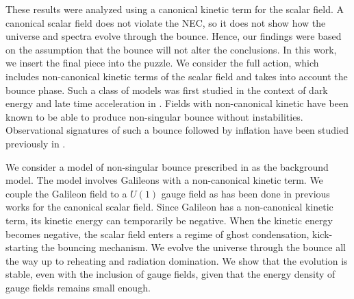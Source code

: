 \documentclass[12pt,a4paper]{article}
\numberwithin{equation}{section}
\numberwithin{equation}{section}
\begin{document}
These results were analyzed using a canonical kinetic term for the scalar field. A canonical scalar field does not violate the NEC, so it does not show how the universe and spectra evolve through the bounce. Hence, our findings were based on the assumption that the bounce will not alter the conclusions.  In this work, we insert the final piece into the puzzle. We consider the full action, which includes non-canonical kinetic terms of the scalar field and takes into account the bounce phase. Such a class of models was first studied in the context of dark energy and late time acceleration in  \cite{Deffayet:2010qz}. Fields with non-canonical kinetic have been known to be able to produce non-singular bounce 
 \cite{Cai:2012va,Qiu:2015nha,Easson:2011zy,Koehn:2015vvy} without instabilities. Observational signatures of such a bounce followed by inflation have been studied previously in \cite{Ni:2017jxw}.

We consider a model of non-singular bounce prescribed in \cite{Cai:2012va} as the background model. The model involves Galileons with a non-canonical kinetic term. We couple the Galileon field to a $U(1)$ gauge field as has been done in previous works for the canonical scalar field. Since Galileon has a non-canonical kinetic term, its kinetic energy can temporarily be negative. When the kinetic energy becomes negative, the scalar field enters a regime of ghost condensation, kick-starting the bouncing mechanism. 
We evolve the universe through the bounce all the way up to reheating and radiation domination. We show that the evolution is stable, even with the inclusion of gauge fields, given that the energy density of gauge fields remains small enough. 
\end{document}
